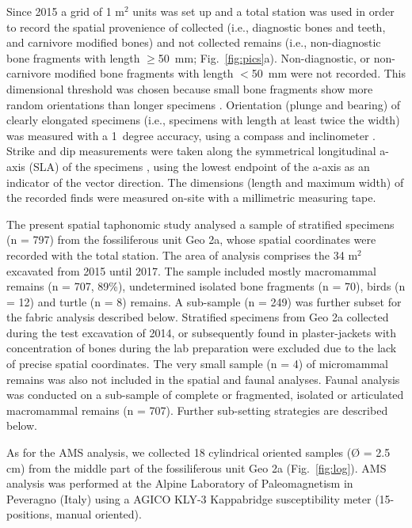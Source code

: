 \documentclass[review,times,authoryear]{elsarticle} %
\begin{document}
Since 2015 a grid of 1 m$^2$ units was set up and a total station was used in order to record the spatial provenience of collected (i.e., diagnostic bones and teeth, and carnivore modified bones) and not collected remains (i.e., non-diagnostic bone fragments with length $\geq$50~mm; Fig.~\ref{fig:pics}a). Non-diagnostic, or non-carnivore modified bone fragments with length $<$50~mm were not recorded. This dimensional threshold was chosen because small bone fragments show more random orientations than longer specimens \citep{Dominguez-Rodrigo2014}. Orientation (plunge and bearing) of clearly elongated specimens (i.e., specimens with length at least twice the width) was measured with a 1~degree accuracy, using a compass and inclinometer \citep[][among others]{Voorhies1969,Fiorillo1991,Eberth2007}. Strike and dip measurements were taken along the symmetrical longitudinal a-axis (SLA) of the specimens \citep{Dominguez-Rodrigo2013}, using the lowest endpoint of the a-axis as an indicator of the vector direction. The dimensions (length and maximum width) of the recorded finds were measured on-site with a millimetric measuring tape.

The present spatial taphonomic study analysed a sample of stratified specimens (n = 797) from the fossiliferous unit Geo 2a, whose spatial coordinates were recorded with the total station. The area of analysis comprises the 34 m$^2$ excavated from 2015 until 2017. The sample included mostly macromammal remains (n = 707, 89\%), undetermined isolated bone fragments (n = 70), birds (n = 12) and turtle (n = 8) remains. A sub-sample (n = 249) was further subset for the fabric analysis described below. Stratified specimens from Geo 2a collected during the test excavation of 2014, or subsequently found in plaster-jackets with concentration of bones during the lab preparation were excluded due to the lack of precise spatial coordinates. The very small sample (n = 4) of micromammal remains was also not included in the spatial and faunal analyses. Faunal analysis was conducted on a sub-sample of complete or fragmented, isolated or articulated macromammal remains (n = 707). Further sub-setting strategies are described below.

As for the AMS analysis, we collected 18 cylindrical oriented samples (Ø = 2.5 cm) from the middle part of the fossiliferous unit Geo 2a (Fig.~\ref{fig:log}). AMS analysis was performed at the Alpine Laboratory of Paleomagnetism in Peveragno (Italy) using a AGICO KLY-3 Kappabridge susceptibility meter (15-positions, manual oriented).
\end{document}
